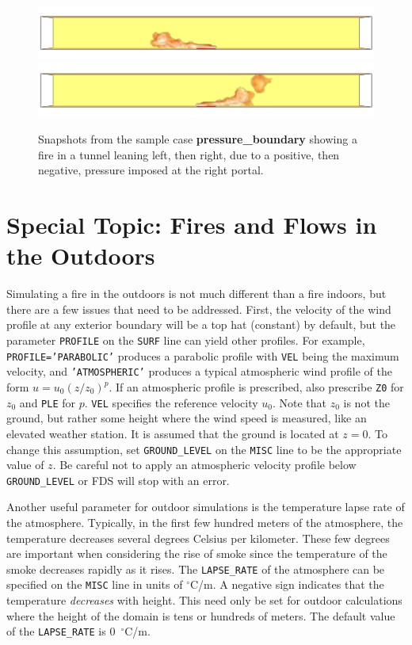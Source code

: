 \documentclass[11pt]{book}
\newcommand{\ct}{\tt\small}
\begin{document}
\begin{figure}[ht]
\includegraphics[width=\textwidth]{SCRIPT_FIGURES/pressure_boundary_left}
\includegraphics[width=\textwidth]{SCRIPT_FIGURES/pressure_boundary_right}
\caption[Example of positive pressure at a tunnel entrance.]{Snapshots from the sample case {\bf pressure\_boundary}
showing a fire in a tunnel leaning left, then right, due to a positive, then negative, pressure imposed at
the right portal.}
\label{pressure_boundary}
\end{figure}


\clearpage

\section{Special Topic: Fires and Flows in the Outdoors}
\label{info:stratification}

Simulating a fire in the outdoors is not much different than a fire
indoors, but there are a few issues that need to be addressed.
First, the velocity of the wind profile at any exterior boundary will be a top hat (constant) by default,
but the parameter {\ct PROFILE} on the {\ct SURF} line
can yield other profiles.
For example, {\ct PROFILE='PARABOLIC'} produces a parabolic profile with
{\ct VEL} being the maximum velocity,
and {\ct 'ATMOSPHERIC'} produces a typical atmospheric wind
profile of the form $u=u_0 (z/z_0)^p$. If an atmospheric profile is
prescribed, also prescribe {\ct Z0} for $z_0$  and {\ct PLE} for $p$.
{\ct VEL} specifies the reference velocity $u_0$. Note that $z_0$ is not the ground, but rather some
height where the wind speed is measured, like an elevated weather station. It is assumed that
the ground is located at $z=0$. To change this assumption, set {\ct GROUND\_LEVEL} on the {\ct MISC} line to be
the appropriate value of $z$. Be careful not to apply an atmospheric velocity profile below {\ct GROUND\_LEVEL} or
FDS will stop with an error.

Another useful parameter for outdoor simulations is the temperature
lapse rate of the atmosphere. Typically, in the first few hundred meters
of the atmosphere, the temperature decreases several degrees Celsius
per kilometer. These few degrees are important when considering the rise
of smoke since the temperature of the smoke decreases rapidly as it
rises. The {\ct LAPSE\_RATE} of the atmosphere can be specified on the
{\ct MISC} line in units of $^\circ$C/m. A negative sign indicates that the
temperature {\em decreases} with height.
This need only be set for outdoor calculations where the height of the
domain is tens or hundreds of meters.
The default value of the {\ct LAPSE\_RATE} is 0~$^\circ$C/m.
\end{document}
